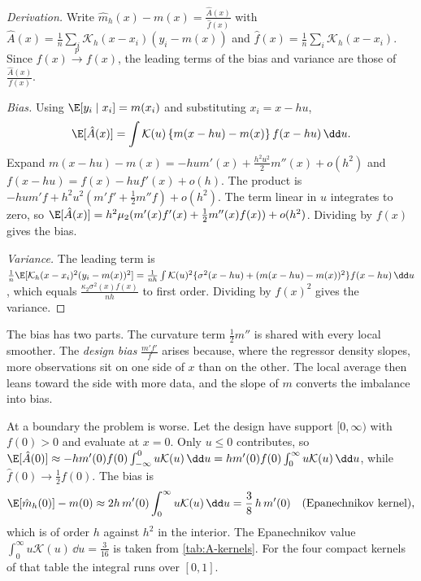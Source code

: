 \begin{proof}[Derivation]
Write $\hat m_h(x)-m(x)=\frac{\hat A(x)}{\hat f(x)}$ with
$\hat A(x)=\frac{1}{n}\sum_i\mathcal{K}_h(x-x_i)(y_i-m(x))$ and $\hat f(x)=\frac{1}{n}\sum_i\mathcal{K}_h(x-x_i)$.
Since $\hat f(x)\xrightarrow{p}f(x)$, the leading terms of the bias and variance are those of
$\frac{\hat A(x)}{f(x)}$.

\emph{Bias.} Using $\E[y_i\mid x_i]=m(x_i)$ and substituting $x_i=x-hu$,
\begin{equation*}
\E[\hat A(x)]=\int\mathcal{K}(u)\,\{m(x-hu)-m(x)\}\,f(x-hu)\,\dd u .
\end{equation*}
Expand $m(x-hu)-m(x)=-hum'(x)+\frac{h^2u^2}{2}m''(x)+o(h^2)$ and $f(x-hu)=f(x)-huf'(x)+o(h)$. The product
is $-hum'f+h^2u^2(m'f'+\frac{1}{2}m''f)+o(h^2)$. The term linear in $u$ integrates to zero, so
$\E[\hat A(x)]=h^2\mu_2(m'(x)f'(x)+\frac{1}{2}m''(x)f(x))+o(h^2)$. Dividing by $f(x)$ gives the bias.

\emph{Variance.} The leading term is
$\frac{1}{n}\E[\mathcal{K}_h(x-x_i)^2(y_i-m(x))^2]=\frac{1}{nh}\int\mathcal{K}(u)^2\{\sigma^2(x-hu)+(m(x-hu)-m(x))^2\}f(x-hu)\,\dd u$,
which equals $\frac{\kappa_2\sigma^2(x)f(x)}{nh}$ to first order. Dividing by $f(x)^2$ gives the variance.
\end{proof}

The bias has two parts. The curvature term $\frac{1}{2}m''$ is shared with every local smoother. The
\emph{design bias} $\frac{m'f'}{f}$ arises because, where the regressor density slopes, more
observations sit on one side of $x$ than on the other. The local average then leans toward the side
with more data, and the slope of $m$ converts the imbalance into bias.

At a boundary the problem is worse. Let the design have support $[0,\infty)$ with $f(0)>0$ and
evaluate at $x=0$. Only $u\le0$ contributes, so
$\E[\hat A(0)]\approx-hm'(0)f(0)\int_{-\infty}^{0}u\mathcal{K}(u)\,\dd u=hm'(0)f(0)\int_0^\infty u\mathcal{K}(u)\,\dd u$,
while $\hat f(0)\to\frac{1}{2}f(0)$. The bias is
\begin{equation}\label{eq:A-nw-boundary}
\E[\hat m_h(0)]-m(0)\approx2h\,m'(0)\int_0^\infty u\mathcal{K}(u)\,\dd u=\frac{3}{8}\,h\,m'(0)
\quad\text{(Epanechnikov kernel)},
\end{equation}
which is of order $h$ against $h^2$ in the interior. The Epanechnikov value
$\int_0^\infty u\mathcal{K}(u)\,\dd u=\frac{3}{16}$ is taken from \cref{tab:A-kernels}. For the four compact kernels of
that table the integral runs over $[0,1]$.

